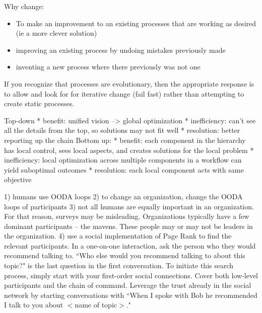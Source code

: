 
Why change:
\begin{itemize}
    \item To make an improvement to an existing processes that are working as desired (ie a more clever solution)
    \item improving an existing process by undoing mistakes previously made
    \item inventing a new process where there previously was not one
\end{itemize}

If you recognize that processes are evolutionary, then the appropriate response is to allow and look for for iterative change (fail fast) rather than attempting to create static processes.

Top-down
* benefit: unified vision --> global optimization
* inefficiency: can't see all the details from the top, so solutions may not fit well
* resolution: better reporting up the chain
Bottom up:
* benefit: each component in the hierarchy has local control, sees local aspects, and creates solutions for the local problem
* inefficiency: local optimization across multiple components in a workflow can yield suboptimal outcomes
* resolution: each local component acts with same objective


1) humans use OODA loops
2) to change an organization, change the OODA loops of participants
3) not all humans are equally important in an organization. For that reason, surveys may be misleading. Organizations typically have a few dominant participants -- the mavens. These people may or may not be leaders in the organization.
4) use a social implementation of Page Rank to find the relevant participants. In a one-on-one interaction, ask the person who they would recommend talking to.
``Who else would you recommend talking to about this topic?" is the last question in the first conversation.
To initiate this search process, simply start with your first-order social connections. Cover both low-level participants and the chain of command.
Leverage the trust already in the social network by starting conversations with ``When I spoke with Bob he recommended I talk to you about $<$name of topic$>$."



